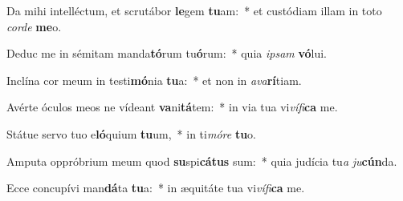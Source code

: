 \item Da mihi intelléctum, et scrutábor \textbf{le}gem \textbf{tu}am:~* et custódiam illam in toto \textit{cor}\textit{de} \textbf{me}o.
\item Deduc me in sémitam manda\textbf{tó}rum tu\textbf{ó}rum:~* quia \textit{ip}\textit{sam} \textbf{vó}lui.
\item Inclína cor meum in testi\textbf{mó}nia \textbf{tu}a:~* et non in \textit{a}\textit{va}\textbf{rí}tiam.
\item Avérte óculos meos ne vídeant \textbf{va}ni\textbf{tá}tem:~* in via tua vi\textit{ví}\textit{fi}\textbf{ca} me.
\item Státue servo tuo e\textbf{ló}quium \textbf{tu}um,~* in ti\textit{mó}\textit{re} \textbf{tu}o.
\item Amputa oppróbrium meum quod \textbf{su}spi\textbf{cá}\textbf{tus} sum:~* quia judícia tu\textit{a} \textit{ju}\textbf{cún}da.
\item Ecce concupívi man\textbf{dá}ta \textbf{tu}a:~* in æquitáte tua vi\textit{ví}\textit{fi}\textbf{ca} me.
